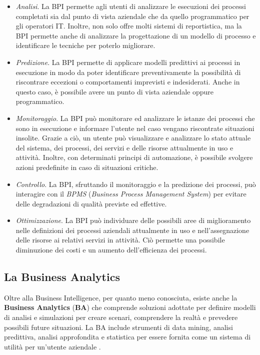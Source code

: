 \begin{itemize}
    \item \textit{Analisi}. La BPI permette agli utenti di analizzare le esecuzioni dei processi completati sia dal punto di vista aziendale che da quello programmatico per gli operatori IT. Inoltre, non solo offre molti sistemi di reportistica, ma la BPI permette anche di analizzare la progettazione di un modello di processo e identificare le tecniche per poterlo migliorare.
    \item \textit{Predizione}. La BPI permette di applicare modelli predittivi ai processi in esecuzione in modo da poter identificare preventivamente la possibilità di riscontrare eccezioni o comportamenti imprevisti e indesiderati. Anche in questo caso, è possibile avere un punto di vista aziendale oppure programmatico.
    \item \textit{Monitoraggio}. La BPI può monitorare ed analizzare le istanze dei processi che sono in esecuzione e informare l'utente nel caso vengano riscontrate situazioni insolite. Grazie a ciò, un utente può visualizzare e analizzare lo stato attuale del sistema, dei processi, dei servizi e delle risorse attualmente in uso e attività. Inoltre, con determinati principi di automazione, è possibile svolgere azioni predefinite in caso di situazioni critiche.
    \item \textit{Controllo}. La BPI, sfruttando il monitoraggio e la predizione dei processi, può interagire con il \textit{BPMS} (\textit{Business Process Management System}) per evitare delle degradazioni di qualità previste ed effettive.
    \item \textit{Ottimizzazione}. La BPI può individuare delle possibili aree di miglioramento nelle definizioni dei processi aziendali attualmente in uso e nell'assegnazione delle risorse ai relativi servizi in attività. Ciò permette una possibile diminuzione dei costi e un aumento dell'efficienza dei processi.
\end{itemize}

\subsection{La Business Analytics}

Oltre alla Business Intelligence, per quanto meno conosciuta, esiste anche la \textbf{Business Analytics} (\textbf{BA}) che comprende soluzioni adottate per definire modelli di analisi e simulazioni per creare scenari, comprendere la realtà e prevedere possibili future situazioni. La BA include strumenti di data mining, analisi predittiva, analisi approfondita e statistica per essere fornita come un sistema di utilità per un'utente aziendale \cite{gartner_ba}.

